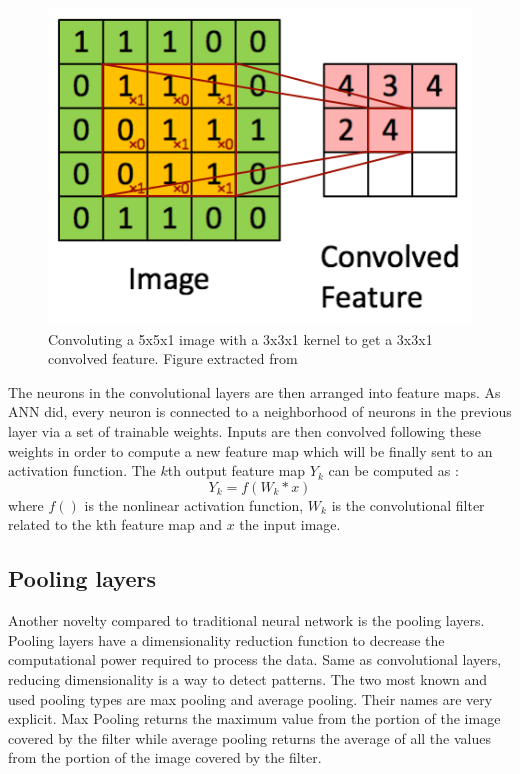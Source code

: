 \documentclass[11pt, openany]{report}
\theoremstyle{plain}
\theoremstyle{definition}
\theoremstyle{remark}
\begin{document}
\begin{figure}[h]
  \centering
  \includegraphics[scale=0.55]{figures/cnn-ex1.png}
  \caption{Convoluting a 5x5x1 image with a 3x3x1 kernel to get a 3x3x1 convolved feature. Figure extracted from \cite{CNN-TDS}}
  \label{fig:cnn-ex1}
\end{figure}

\newpage
The neurons in the convolutional layers are then arranged into feature maps. As ANN did, every neuron is connected to a neighborhood of neurons in the previous layer via a set of trainable weights. Inputs are then convolved following these weights in order to compute a new feature map which will be finally sent to an activation function.  
The $k$th output feature map $Y_{k}$ can be computed as \cite{CNN-1}: 
$$ Y_{k} = f(W_{k} * x) $$ 
where $f()$ is the nonlinear activation function, $W_{k}$ is the convolutional filter related to the kth feature map and $x$ the input image. 


\subsection{Pooling layers} \label{sec:pooling-layers}
Another novelty compared to traditional neural network is the pooling layers. Pooling layers have a dimensionality reduction function to decrease the computational power required to process the data. Same as convolutional layers, reducing dimensionality is a way to detect patterns. The two most known and used pooling types are max pooling and average pooling. Their names are very explicit. Max Pooling returns the maximum value from the portion of the image covered by the filter while average pooling returns the average of all the values from the portion of the image covered by the filter. 
\end{document}
